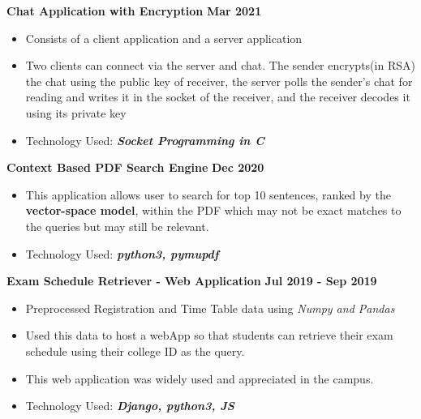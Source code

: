 \documentclass[10pt]{article}
\begin{document}
\spacedhrule{0.15ex}{1.0ex}
\large { \textbf{Chat Application with Encryption}} \normalsize
\href{https://github.com/vezcraz/4-2/tree/master/Computer\%20Networks/Computer\%20Networks\%20lab10} {\hspace{0.5ex}\faMousePointer}
{\hfill} \textbf{Mar 2021}\\[-1.9em]
\begin{itemize}
    \item Consists of a client application and a server application \\[-1.9em]
    \item Two clients can connect via the server and chat. The sender encrypts(in RSA) the chat using the public key of receiver, the server polls the sender's chat for reading and writes it in the socket of the receiver, and the receiver decodes it using its private key \\[-1.9em]
    \item Technology Used: \textit{\textbf{Socket Programming in C}}\\[-1.25em]
\end{itemize}
\large { \textbf{Context Based PDF Search Engine}} \normalsize
\href{ https://github.com/vezcraz/Context-Based-PDF-Search-Engine} {\hspace{0.5ex}\faMousePointer}
{\hfill} \textbf{Dec 2020}\\[-1.9em]
\begin{itemize}
    \item This application allows user to search for top 10 sentences, ranked by the \textbf{vector-space model}, within the PDF which may not be exact matches to the queries but may still be relevant. \\[-1.9em]
    \item Technology Used: \textit{\textbf{python3, pymupdf}}\\[-1.25em]
\end{itemize}
\large { \textbf{Exam Schedule Retriever - Web Application}} \normalsize
\href{https://know-your-exam-schedule.herokuapp.com/} {\hspace{0.5ex}\faMousePointer}
\href{ https://github.com/vezcraz/Exam-Schedule} {\hspace{0.5ex}\faMousePointer}
{\hfill} \textbf{Jul 2019 - Sep 2019}\\[-1.9em]
\begin{itemize}
    \item Preprocessed Registration and Time Table data using \textit{Numpy and Pandas} \\[-1.9em]
    \item Used this data to host a webApp so that students can retrieve their exam schedule using their college ID as the query.\\[-1.9em]
    \item This web application was widely used and appreciated in the campus. \\[-1.9em]
    \item Technology Used: \textit{\textbf{Django, python3, JS}}\\[-2em]
\end{itemize}
\vspace{-0.5ex}
\end{document}
